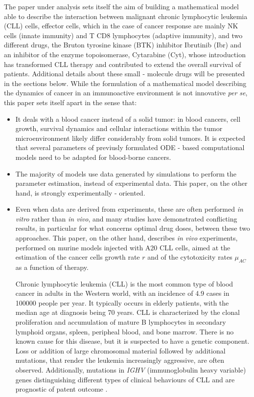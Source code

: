 The paper under analysis sets itself the aim of building a mathematical model able to describe the interaction between malignant chronic lymphocytic leukemia (CLL) cells, effector cells, which in the case of cancer response are mainly NK cells (innate immunity) and T CD8 lymphocytes (adaptive immunity), and two different drugs, the Bruton tyrosine kinase (BTK) inhibitor Ibrutinib (Ibr) and an inhibitor of the enzyme topoisomerase, Cytarabine (Cyt), whose introduction has transformed CLL therapy and contributed to extend the overall survival of patients. Additional details about these small - molecule drugs will be presented in the sections below. While the formulation of a mathematical model describing the dynamics of cancer in an immunoactive environment is not innovative \textit{per se}, this paper sets itself apart in the sense that:
\begin{itemize}
\item It deals with a blood cancer instead of a solid tumor: in blood cancers, cell growth, survival dynamics and cellular interactions within the
tumor microenvironment likely differ considerably from solid tumors. It is expected that several parameters of previusly formulated ODE - based computational models need to be adapted for blood-borne cancers.
\item The majority of models use data generated by simulations to perform the parameter estimation, instead of experimental data. This paper, on the other hand, is strongly experimentally - oriented.
\item Even when data are derived from experiments, these are often performed \textit{in vitro} rather than \textit{in vivo}, and many studies have demonstrated conflicting results, in particular for what concerns optimal drug doses, between these two approaches. This paper, on the other hand, describes \textit{in vivo} experiments, performed on murine models injected with A20 CLL cells, aimed at the estimation of the cancer cells growth rate $r$ and of the cytotoxicity rates $\mu_{AC}$ as a function of therapy. \par
\vspace{0.4cm}
Chronic lymphocytic leukemia (CLL) is the most common type of blood cancer in adults in the Western world, with an incidence of 4.9 cases in 100000 people per year. It typically occurs in elderly patients, with the median age at diagnosis being 70 years. CLL is characterized by the clonal proliferation and accumulation of mature B lymphocytes in secondary lymphoid organs, spleen, peripheal blood, and bone marrow. \cite{cll-burger-med, cll-rozman-med}  There is no known cause for this disease, but it is suspected to have a genetic component. Loss or addition of large chromosomal material followed by additional mutations, that render the leukemia increasingly aggressive, are often observed. Additionally, mutations in \textit{IGHV} (immunoglobulin heavy variable) genes distinguishing different types of clinical behaviours of CLL and are prognostic of patent outcome \cite{immunogl-med}. \par

\end{itemize}
